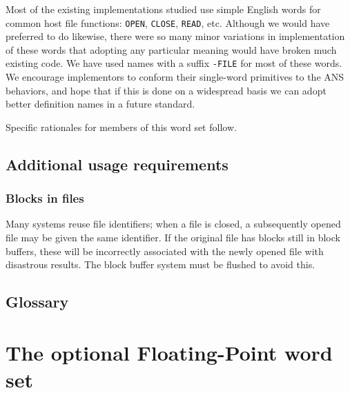 Most of the existing implementations studied use simple English words
for common host file functions: \texttt{OPEN}, \texttt{CLOSE},
\texttt{READ}, etc.  Although we would have preferred to do likewise,
there were so many minor variations in implementation of these words
that adopting any particular meaning would have broken much existing
code.  We have used names with a suffix \texttt{-FILE} for most of these
words.  We encourage implementors to conform their single-word primitives
to the ANS behaviors, and hope that if this is done on a widespread
basis we can adopt better definition names in a future standard.

Specific rationales for members of this word set follow.

\setcounter{subsection}{2}
\subsection{Additional usage requirements} %

\setcounter{subsubsection}{1}
\subsubsection{Blocks in files} %

Many systems reuse file identifiers; when a file is closed, a
subsequently opened file may be given the same identifier. If the
original file has blocks still in block buffers, these will be
incorrectly associated with the newly opened file with disastrous
results. The block buffer system must be flushed to avoid this.

\setcounter{subsection}{5}
\subsection{Glossary} %



\section{The optional Floating-Point word set} %
\label{rat:floating}

